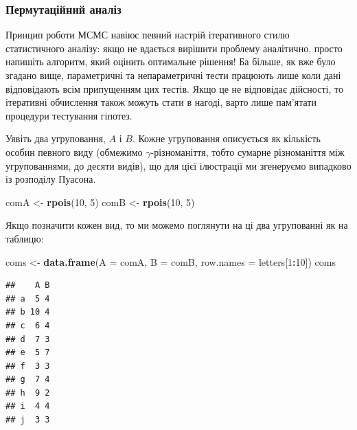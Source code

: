 \documentclass[
  11pt,
]{book}
\newenvironment{Shaded}{\begin{snugshade}}{\end{snugshade}}
\newcommand{\AttributeTok}[1]{\textcolor[rgb]{0.13,0.29,0.53}{#1}}
\newcommand{\DecValTok}[1]{\textcolor[rgb]{0.00,0.00,0.81}{#1}}
\newcommand{\FunctionTok}[1]{\textcolor[rgb]{0.13,0.29,0.53}{\textbf{#1}}}
\newcommand{\NormalTok}[1]{#1}
\newcommand{\OtherTok}[1]{\textcolor[rgb]{0.56,0.35,0.01}{#1}}
\newcommand{\SpecialCharTok}[1]{\textcolor[rgb]{0.81,0.36,0.00}{\textbf{#1}}}
\begin{document}
\subsubsection{Пермутаційний аналіз}\label{ux43fux435ux440ux43cux443ux442ux430ux446ux456ux439ux43dux438ux439-ux430ux43dux430ux43bux456ux437}

Принцип роботи МСМС навіює певний настрій ітеративного стилю статистичного аналізу: якщо не вдається вирішити проблему аналітично, просто напишіть алгоритм, який оцінить оптимальне рішення! Ба більше, як вже було згадано вище, параметричні та непараметричні тести працюють лише коли дані відповідають всім припущенням цих тестів. Якщо це не відповідає дійсності, то ітеративні обчислення також можуть стати в нагоді, варто лише пам'ятати процедури тестування гіпотез.

Уявіть два угруповання, \(A\) і \(B\). Кожне угруповання описується як кількість особин певного виду (обмежимо \(\gamma\)-різноманіття, тобто сумарне різноманіття між угрупованнями, до десяти видів), що для цієї ілюстрації ми згенеруємо випадково із розподілу Пуасона.

\begin{Shaded}
\begin{Highlighting}[]
\NormalTok{comA }\OtherTok{\textless{}{-}} \FunctionTok{rpois}\NormalTok{(}\DecValTok{10}\NormalTok{, }\DecValTok{5}\NormalTok{)}
\NormalTok{comB }\OtherTok{\textless{}{-}} \FunctionTok{rpois}\NormalTok{(}\DecValTok{10}\NormalTok{, }\DecValTok{5}\NormalTok{)}
\end{Highlighting}
\end{Shaded}

Якщо позначити кожен вид, то ми можемо поглянути на ці два угрупованні як на таблицю:

\begin{Shaded}
\begin{Highlighting}[]
\NormalTok{coms }\OtherTok{\textless{}{-}} \FunctionTok{data.frame}\NormalTok{(}\AttributeTok{A =}\NormalTok{ comA, }\AttributeTok{B =}\NormalTok{ comB, }\AttributeTok{row.names =}\NormalTok{ letters[}\DecValTok{1}\SpecialCharTok{:}\DecValTok{10}\NormalTok{])}
\NormalTok{coms}
\end{Highlighting}
\end{Shaded}

\begin{verbatim}
##    A B
## a  5 4
## b 10 4
## c  6 4
## d  7 3
## e  5 7
## f  3 3
## g  7 4
## h  9 2
## i  4 4
## j  3 3
\end{verbatim}
\end{document}
